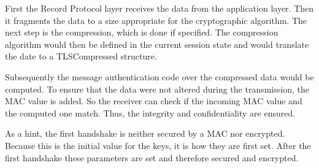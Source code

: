 First the Record Protocol layer receives the data from the application layer. Then it fragments the data to a size appropriate for the cryptographic algorithm. 
The next step is the compression, which is done if specified. The compression algorithm would then be defined in the current session state and would translate the date to a TLSCompressed structure.
 
Subsequently the message authentication code over the compressed data would be computed.
To ensure that the data were not altered during the transmission, the MAC value is added. So the receiver can check if the incoming MAC value and the computed one 
match. Thus, the integrity and confidentiality are ensured.

As a hint, the first handshake is neither secured by a MAC nor encrypted. Because this is the initial value for the keys, it is how they are first set. After the first handshake these parameters are set and therefore secured and encrypted.
\cite{ms:Record} \cite{Hassenstein}